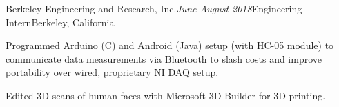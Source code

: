 \begin{rSubsection}{Berkeley Engineering and Research, Inc.}{\em June-August 2018}{Engineering Intern}{Berkeley, California}

\item Programmed Arduino (C) and Android (Java) setup (with HC-05 module) to communicate data measurements via Bluetooth to slash costs and improve portability over wired, proprietary NI DAQ setup.
\item Edited 3D scans of human faces with Microsoft 3D Builder for 3D printing.
\end{rSubsection}